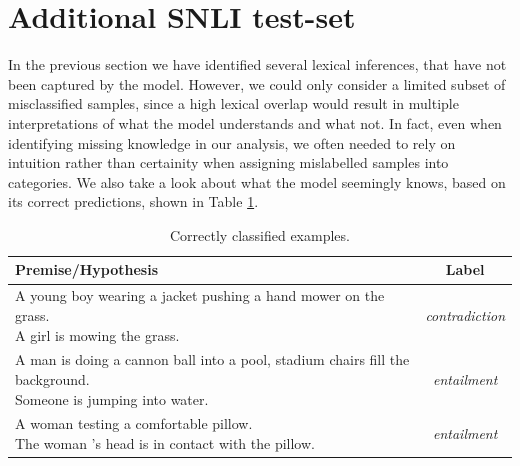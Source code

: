 \section{Additional SNLI test-set}\label{sec:additional_snli_set}
In the previous section we have identified several lexical inferences, that have not been captured by the model. However, we could only consider a limited subset of misclassified samples, since a high lexical overlap would result in multiple interpretations of what the model understands and what not. In fact, even when identifying missing knowledge in our analysis, we often needed to rely on intuition rather than certainity when assigning mislabelled samples into categories. We also take a look about what the model seemingly knows, based on its correct predictions, shown in Table \ref{table:correct_samples}.
\begin{table}[!htbp]
\begin{center}
\begin{tabular}{lc}
\textbf{Premise/Hypothesis} & \textbf{Label} \\
\toprule
\specialcell{A young boy wearing a jacket pushing a hand mower on the grass.\\A girl is mowing the grass.} & \textit{contradiction} \\
\midrule
\specialcell{A man is doing a cannon ball into a pool, stadium chairs fill the background.\\Someone is jumping into water.} & \textit{entailment} \\
\midrule
\specialcell{A woman testing a comfortable pillow.\\The woman 's head is in contact with the pillow.} & \textit{entailment} \\
\bottomrule
\end{tabular}
\caption{Correctly classified examples.}
\label{table:correct_samples}
\end{center}
\end{table}

